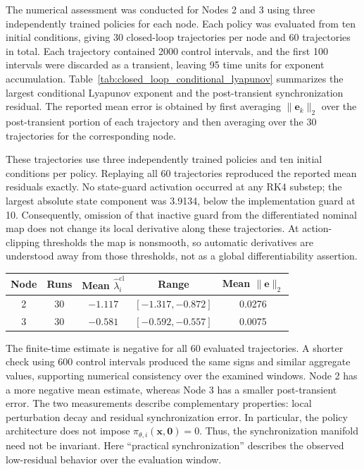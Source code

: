 \documentclass[a4paper,fleqn]{cas-sc}
\theoremstyle{plain}
\theoremstyle{definition}
\begin{document}
The numerical assessment was conducted for Nodes 2 and 3 using three independently trained policies for each node. Each policy was evaluated from ten initial conditions, giving 30 closed-loop trajectories per node and 60 trajectories in total. Each trajectory contained 2000 control intervals, and the first 100 intervals were discarded as a transient, leaving 95 time units for exponent accumulation. Table~\ref{tab:closed_loop_conditional_lyapunov} summarizes the largest conditional Lyapunov exponent and the post-transient synchronization residual. The reported mean error is obtained by first averaging $\|\mathbf{e}_k\|_2$ over the post-transient portion of each trajectory and then averaging over the 30 trajectories for the corresponding node.

These trajectories use three independently trained policies and ten initial conditions per policy. Replaying all 60 trajectories reproduced the reported mean residuals exactly. No state-guard activation occurred at any RK4 substep; the largest absolute state component was 3.9134, below the implementation guard at 10. Consequently, omission of that inactive guard from the differentiated nominal map does not change its local derivative along these trajectories. At action-clipping thresholds the map is nonsmooth, so automatic derivatives are understood away from those thresholds, not as a global differentiability assertion.

\begin{center}
	\centering
	\small
	\label{tab:closed_loop_conditional_lyapunov}
	\begin{tabular}{@{}ccccc@{}}
		\toprule
		Node & Runs & Mean $\widehat\lambda_i^{\mathrm{cl}}$ & Range & Mean $\|\mathbf{e}\|_2$ \\
		\midrule
		2 & 30 & $-1.117$ & $[-1.317,-0.872]$ & 0.0276 \\
		3 & 30 & $-0.581$ & $[-0.592,-0.557]$ & 0.0075 \\
		\bottomrule
	\end{tabular}
\end{center}

The finite-time estimate is negative for all 60 evaluated trajectories. A shorter check using 600 control intervals produced the same signs and similar aggregate values, supporting numerical consistency over the examined windows. Node 2 has a more negative mean estimate, whereas Node 3 has a smaller post-transient error. The two measurements describe complementary properties: local perturbation decay and residual synchronization error. In particular, the policy architecture does not impose $\pi_{\theta,i}(\mathbf{x},\mathbf{0})=0$. Thus, the synchronization manifold need not be invariant. Here ``practical synchronization'' describes the observed low-residual behavior over the evaluation window.
\end{document}
